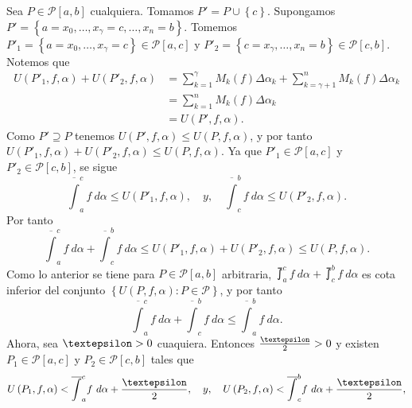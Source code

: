 Sea $P\in\mathcal{P}\left[a,b\right]$ cualquiera. Tomamos $P'=P\cup\left\lbrace c\right\rbrace$. Supongamos $P'=\left\lbrace a=x_0,\dots,x_\gamma=c,\dots,x_n=b\right\rbrace$. Tomemos $P'_1=\left\lbrace a=x_0,\dots,x_\gamma=c\right\rbrace\in\mathcal{P}\left[a,c\right]$ y $P'_2=\left\lbrace c=x_\gamma,\dots,x_n=b\right\rbrace\in\mathcal{P}\left[c,b\right]$. Notemos que
  \begin{align*}
  U\left(P'_1,f,\alpha\right)+U\left(P'_2,f,\alpha\right)&=\sum_{k=1}^{\gamma}M_k\left(f\right)\Delta\alpha_k+\sum_{k=\gamma+1}^{n}M_k\left(f\right)\Delta\alpha_k\\
  &=\sum_{k=1}^{n}M_k\left(f\right)\Delta\alpha_k\\
  &=U\left(P',f,\alpha\right).
  \end{align*}
  Como $P'\supseteq P$ tenemos $U\left(P',f,\alpha\right)\leq U\left(P,f,\alpha\right)$, y por tanto $U\left(P'_1,f,\alpha\right)+U\left(P'_2,f,\alpha\right)\leq U\left(P,f,\alpha\right)$. Ya que $P'_1\in\mathcal{P}\left[a,c\right]$ y $P'_2\in\mathcal{P}\left[c,b\right]$, se sigue
  \begin{equation*}
    \overline{\int}_a^c f\ d\alpha \leq U\left(P'_1,f,\alpha\right),\quad y,\quad \overline{\int}_c^b f\ d\alpha \leq U\left(P'_2,f,\alpha\right).
  \end{equation*}
  Por tanto
  \begin{equation*}
    \overline{\int}_a^c f\ d\alpha + \overline{\int}_c^b f\ d\alpha \leq U\left(P'_1,f,\alpha\right)+U\left(P'_2,f,\alpha\right)\leq U\left(P,f,\alpha\right).
  \end{equation*}
  Como lo anterior se tiene para $P\in\mathcal{P}\left[a,b\right]$ arbitraria, $\upint_a^c f\ d\alpha + \upint_c^b f\ d\alpha$ es cota inferior del conjunto $\left\lbrace U\left(P,f,\alpha\right):P\in\mathcal{P}\right\rbrace$, y por tanto
  \setcounter{equation}{0}
  \begin{equation}
    \overline{\int}_a^c f\ d\alpha + \overline{\int}_c^b f\ d\alpha \leq \overline{\int}_a^b f\ d\alpha.
  \end{equation}
  Ahora, sea $\text{\textepsilon}>0$ cuaquiera. Entonces $\frac{\text{\textepsilon}}{2}>0$ y existen $P_1\in\mathcal{P}\left[a,c\right]$ y $P_2\in\mathcal{P}\left[c,b\right]$ tales que
  \begin{equation*}
    U\left(P_1,f,\alpha\right)<\overline{\int}_a^c f\ d\alpha+\frac{\text{\textepsilon}}{2},\quad y,\quad U\left(P_2,f,\alpha\right)<\overline{\int}_c^b f\ d\alpha+\frac{\text{\textepsilon}}{2},
  \end{equation*}
